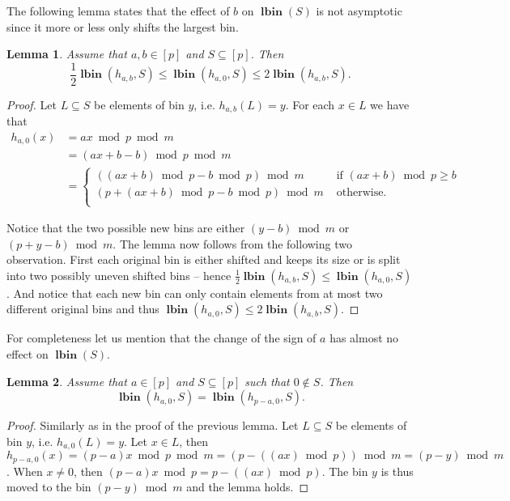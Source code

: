 \documentclass{article}
\newcommand{\lbin}[2]{\operatorname{\mathbf{lbin}}({#1}, {#2})}
\newcommand{\vlbin}[1]{\operatorname{\mathbf{lbin}}({#1})}
\newtheorem{lemma}{Lemma}
\begin{document}
The following lemma states that the effect of $b$ on $\vlbin{S}$ is not asymptotic since it more or less only shifts the largest bin.
\begin{lemma}
\label{lm:b-zero}
Assume that  $a, b \in [p]$ and $S \subseteq [p]$. Then \[ \frac{1}{2} \lbin{h_{a, b}}{S} \leq \lbin{h_{a, 0}}{S} \leq 2\lbin{h_{a, b}}{S} . \]
\end{lemma}
\begin{proof}
Let $L \subseteq S$ be elements of bin $y$, i.e. $h_{a, b}(L) = y$.
For each $x \in L$ we have that 
\begin{align*}
h_{a, 0}(x) 
	& = ax \bmod p \bmod m \\ 
	& = (ax + b - b) \bmod p \bmod m \\ 
	& = \begin{cases}
((ax + b) \bmod p - b \bmod p)\bmod m & \mbox{ if } (ax + b) \bmod p \geq b \\
(p + (ax + b) \bmod p - b \bmod p) \bmod m & \mbox{ otherwise.} \\
\end{cases}
\end{align*}

Notice that the two possible new bins are either $(y - b) \bmod m$ or $(p + y - b) \bmod m$.
The lemma now follows from the following two observation.
First each original bin is either shifted and keeps its size or is split into two possibly uneven shifted bins -- hence $\frac{1}{2} \lbin{h_{a, b}}{S} \leq \lbin{h_{a, 0}}{S}$.
And notice that each new bin can only contain elements from at most two different original bins and thus $\lbin{h_{a, 0}}{S} \leq 2\lbin{h_{a, b}}{S}$.
\end{proof}

For completeness let us mention that the change of the sign of $a$ has almost no effect on $\vlbin{S}$.
\begin{lemma}
\label{lemma:sign-a}
Assume that  $a \in [p]$ and $S \subseteq [p]$ such that $0 \not\in S$. Then \[ \lbin{h_{a, 0}}{S} = \lbin{h_{p - a, 0}}{S} . \]
\end{lemma}
\begin{proof}
Similarly as in the proof of the previous lemma. Let $L \subseteq S$ be elements of bin $y$, i.e. $h_{a, 0}(L) = y$.
Let $x \in L$, then $h_{p - a, 0}(x) = (p - a)x \bmod p \bmod m = (p - ((ax) \bmod p))\bmod m = (p - y) \bmod m$.
When $x \neq 0$, then $(p - a)x \bmod p = p - ((ax) \bmod p)$.
The bin $y$ is thus moved to the bin $(p - y) \bmod m$ and the lemma holds.
\end{proof}
\end{document}
